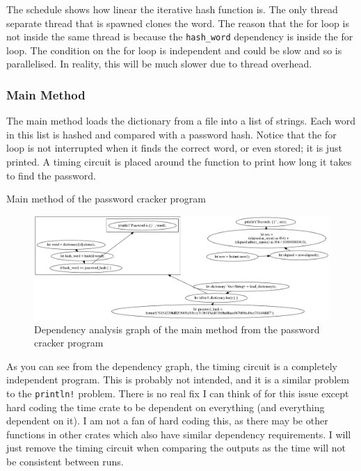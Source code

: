 The schedule shows how linear the iterative hash function is. The only thread separate thread that is spawned clones the word. The reason that the for loop is not inside the same thread is because the \texttt{hash\_word} dependency is inside the for loop. The condition on the for loop is independent and could be slow and so is parallelised. In reality, this will be much slower due to thread overhead.

\subsubsection{Main Method}
The main method loads the dictionary from a file into a list of strings. Each word in this list is hashed and compared with a password hash. Notice that the for loop is not interrupted when it finds the correct word, or even stored; it is just printed. A timing circuit is placed around the function to print how long it takes to find the password.
\begin{code}
    \caption{Main method of the password cracker program}
\end{code}

\begin{figure}[H]
    \centering
    \includegraphics[width=\textwidth]{img/password-cracker/main-dependency-analysis.png}
    \caption{Dependency analysis graph of the main method from the password cracker program}
\end{figure}

As you can see from the dependency graph, the timing circuit is a completely independent program. This is probably not intended, and it is a similar problem to the \texttt{println!} problem. There is no real fix I can think of for this issue except hard coding the time crate to be dependent on everything (and everything dependent on it). I am not a fan of hard coding this, as there may be other functions in other crates which also have similar dependency requirements. I will just remove the timing circuit when comparing the outputs as the time will not be consistent between runs.

